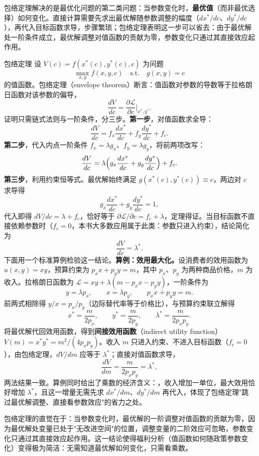 包络定理解决的是最优化问题的第二类问题：当参数变化时，\textbf{最优值}（而非最优选择）如何变化。直接计算需要先求出最优解随参数调整的幅度（$dx^*/dc$、$dy^*/dc$），再代入目标函数求导，步骤繁琐；包络定理表明这一步可以省去：由于最优解处一阶条件成立，最优解调整对值函数的贡献为零，参数变化只通过其直接效应起作用。

\begin{derivation}{包络定理}{}
设 $V(c) = f(x^*(c), y^*(c), c)$ 为问题
\[
\max_{x,y} f(x,y,c) \quad \text{s.t.} \quad g(x,y) = c
\]
的值函数。包络定理（envelope theorem）断言：值函数对参数的导数等于拉格朗日函数对该参数的偏导，
\[
\frac{dV}{dc} = \frac{\partial \mathcal{L}}{\partial c}\Big|_{x^*,y^*}.
\]
证明只需链式法则与一阶条件，分三步。\textbf{第一步}，对值函数求全导：
\[
\frac{dV}{dc} = f_x\frac{dx^*}{dc} + f_y\frac{dy^*}{dc} + f_c.
\]
\textbf{第二步}，代入内点一阶条件 $f_x = \lambda g_x$、$f_y = \lambda g_y$，将前两项改写：
\[
\frac{dV}{dc} = \lambda\Bigl(g_x\frac{dx^*}{dc} + g_y\frac{dy^*}{dc}\Bigr) + f_c.
\]
\textbf{第三步}，利用约束恒等式。最优解始终满足 $g(x^*(c), y^*(c)) \equiv c$，两边对 $c$ 求导得
\[
g_x\frac{dx^*}{dc} + g_y\frac{dy^*}{dc} = 1,
\]
代入即得 $dV/dc = \lambda + f_c$，恰好等于 $\partial\mathcal{L}/\partial c = f_c + \lambda$，定理得证。当目标函数不直接依赖参数时（$f_c = 0$，本书大多数应用属于此类：参数只进入约束），结论简化为
\[
\frac{dV}{dc} = \lambda^*.
\]
下面用一个标准算例检验这一结论。\textbf{算例：效用最大化。}设消费者的效用函数为 $u(x,y) = xy$，预算约束为 $p_x x + p_y y = m$，其中 $p_x$、$p_y$ 为两种商品价格，$m$ 为收入。拉格朗日函数为 $\mathcal{L} = xy + \lambda(m - p_x x - p_y y)$，一阶条件为
\[
y = \lambda p_x, \qquad x = \lambda p_y, \qquad p_x x + p_y y = m.
\]
前两式相除得 $y/x = p_x/p_y$（边际替代率等于价格比），与预算约束联立解得
\[
x^* = \frac{m}{2p_x}, \qquad y^* = \frac{m}{2p_y}, \qquad \lambda^* = \frac{m}{2p_x p_y}.
\]
将最优解代回效用函数，得到\textbf{间接效用函数}（indirect utility function）$V(m) = x^* y^* = m^2/(4p_x p_y)$。收入 $m$ 只进入约束、不进入目标函数（$f_c = 0$），由包络定理，$dV/dm$ 应等于 $\lambda^*$；直接对值函数求导，
\[
\frac{dV}{dm} = \frac{m}{2p_x p_y} = \lambda^*,
\]
两法结果一致。算例同时给出了乘数的经济含义：，收入增加一单位，最大效用恰好增加 $\lambda^*$，且这一增量无需先求 $dx^*/dm$、$dy^*/dm$ 再代入，体现了包络定理"跳过最优解调整、直接看参数效应"的省力之处。
\end{derivation}

包络定理的直觉在于：当参数变化时，最优解的一阶调整对值函数的贡献为零，因为最优解处变量已处于"无改进空间"的位置，调整变量的二阶效应可忽略，参数变化只通过其直接效应起作用。这一结论使得福利分析（值函数如何随政策参数变化）变得极为简洁：无需知道最优解如何变化，只需看乘数。

